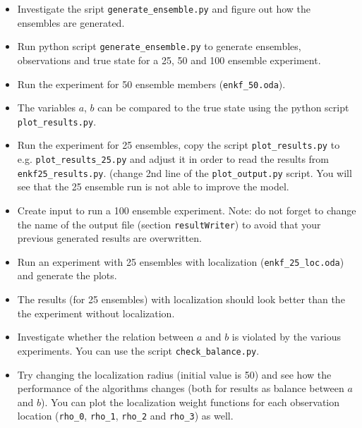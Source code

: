 \begin{itemize}
\item Investigate the sript {\tt generate\_ensemble.py} and figure out how the ensembles are generated.
\item Run python script {\tt generate\_ensemble.py} to generate ensembles, observations and true state for a 25, 50 and 100 ensemble experiment.  
\item Run the experiment for 50 ensemble members ({\tt enkf\_50.oda}).
\item The variables $a$, $b$ can be compared to the true state using the python script {\tt plot\_results.py}.
\item Run the experiment for 25 ensembles, copy the script {\tt plot\_results.py} to e.g. {\tt plot\_results\_25.py} and adjust it in order to read the results from {\tt enkf25\_results.py}.
(change 2nd line of the {\tt plot\_output.py} script. You will see that the 25 ensemble run is not able to improve the model.
\item Create input to run a 100 ensemble experiment. Note: do not forget to change the name of the output file (section {\tt resultWriter}) 
to avoid that your previous generated results are overwritten. 
\item Run an experiment with 25 ensembles with localization ({\tt enkf\_25\_loc.oda}) and generate the plots.
\item The results (for 25 ensembles) with localization should look better than the the experiment without localization.
\item Investigate whether the relation between $a$ and $b$ is violated by the various experiments. You can use the script {\tt check\_balance.py}.
\item Try changing the localization radius (initial value is 50) and see how the performance of the algorithms changes (both for results as balance between $a$ and $b$). You can plot the localization weight functions for each observation location ({\tt rho\_0}, {\tt rho\_1}, {\tt rho\_2} and {\tt rho\_3}) as well.
\end{itemize}








